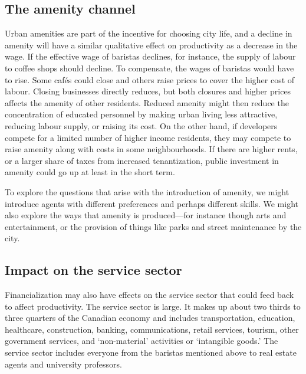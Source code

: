 \subsection{The amenity channel}
Urban amenities are part of the incentive for choosing city life, and a decline in amenity will have a similar qualitative effect on productivity as a decrease in the wage.  If the effective wage of  baristas declines, for instance, the supply of labour to coffee shops should decline. To compensate, the wages of baristas would have to rise. Some caf\'es could close and others raise prices to cover the higher cost of labour. Closing businesses directly reduces, but both closures and higher prices affects the amenity of other residents. Reduced amenity might then reduce the concentration of educated personnel by %
making urban living less attractive, reducing labour supply, or raising its cost. 
On the other hand, if developers compete for a limited number of higher income residents, they may compete to raise amenity along with costs in some neighbourhoods. If there are higher rents, or a larger share of taxes from increased \gls{tenantization}, public investment in amenity could go up at least in the short term. %

To explore the questions that arise with the introduction of amenity, we might introduce agents with different preferences and perhaps different skills. %
We might also explore the ways that amenity is produced---for instance though arts and entertainment, or the provision of things like parks and street maintenance by the city.
 

\subsection{Impact on the service sector}
Financialization may also have effects on the service sector that could feed back to affect productivity. The service sector is large. It makes up about two thirds to three quarters of the Canadian economy and includes transportation, education, healthcare, construction, banking, communications, retail services, tourism, other government services, and `non-material' activities or `intangible goods.' %
The service sector includes everyone from the baristas mentioned above to real estate agents and university professors. 

